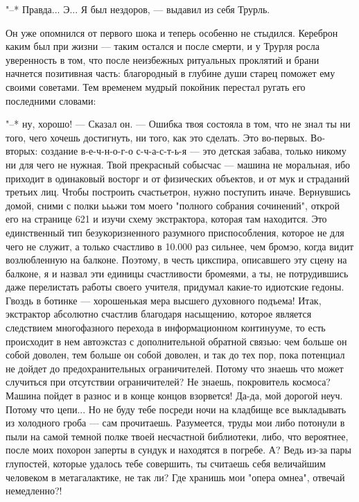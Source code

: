 "--* Правда... Э... Я был нездоров, --- выдавил из себя
Трурль.

Он уже опомнился от первого шока и теперь особенно не
стыдился. Кереброн каким был при жизни --- таким остался и
после смерти, и у Трурля росла уверенность в том, что после
неизбежных ритуальных проклятий и брани начнется позитивная
часть: благородный в глубине души старец поможет ему своими
советами. Тем временем мудрый покойник перестал ругать его
последними словами:

"--* ну, хорошо! --- Сказал он. --- Ошибка твоя состояла в
том, что не знал ты ни того, чего хочешь достигнуть, ни
того, как это сделать. Это во-первых. Во-вторых: создание
в-е-ч-н-о-г-о с-ч-а-с-т-ь-я --- это детская забава, только
никому ни для чего не нужная. Твой прекрасный собысчас --- машина
не моральная, ибо приходит в одинаковый восторг и от
физических объектов, и от мук и страданий третьих лиц. Чтобы
построить счастьетрон, нужно поступить иначе. Вернувшись
домой, сними с полки ьььжи том моего "полного собрания
сочинений", открой его на странице 621 и изучи схему
экстрактора, которая там находится. Это единственный тип
безукоризненного разумного приспособления, которое не для
чего не служит, а только счастливо в 10.000 раз сильнее, чем
бромэо, когда видит возлюбленную на балконе. Поэтому, в
честь цикспира, описавшего эту сцену на балконе, я и назвал
эти единицы счастливости бромеями, а ты, не потрудившись
даже перелистать работы своего учителя, придумал какие-то
идиотские гедоны. Гвоздь в ботинке --- хорошенькая мера
высшего духовного подъема! Итак, экстрактор абсолютно
счастлив благодаря насыщению, которое является следствием
многофазного перехода в информационном континууме, то есть
происходит в нем автоэкстаз с дополнительной обратной
связью: чем больше он собой доволен, тем больше он собой
доволен, и так до тех пор, пока потенциал не дойдет до
предохранительных ограничителей. Потому что знаешь что может
случиться при отсутствии ограничителей? Не знаешь,
покровитель космоса? Машина пойдет в разнос и в конце концов
взорвется! Да-да, мой дорогой неуч. Потому что цепи... Но не
буду тебе посреди ночи на кладбище все выкладывать из
холодного гроба --- сам прочитаешь. Разумеется, труды мои либо
потонули в пыли на самой темной полке твоей несчастной
библиотеки, либо, что вероятнее, после моих похорон заперты
в сундук и находятся в погребе. А? Ведь из-за пары
глупостей, которые удалось тебе совершить, ты считаешь себя
величайшим человеком в метагалактике, не так ли? Где хранишь
мои "опера омнеа", отвечай немедленно?!

